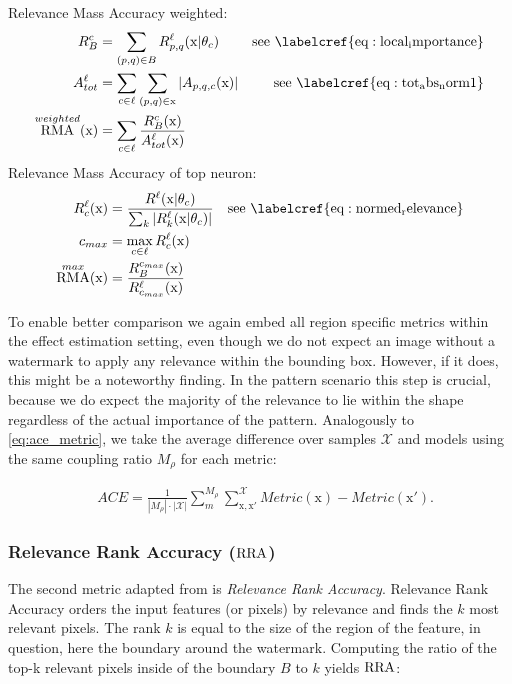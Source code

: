 Relevance Mass Accuracy weighted:
\begin{align}\displaystyle
R_B^c &= \sum_{(p,q) \in B} R_{p,q}^{\ell}(\mathrm{x} | \theta_c) & \mathrm{ see \ \labelcref{eq:local_importance}} \\
A_{tot}^{\ell} &=\sum_{c \in \ell} \sum_{(p,q) \in \mathrm{x}} |A_{p,q,c}(\mathrm{x})| & \mathrm{ see \ \labelcref{eq:tot_abs_norm1}} \\
\RMA^{weighted}(\mathrm{x}) &= \sum_{c \in \ell}  \frac{R_{B}^{c}(\mathrm{x})}{A_{tot}^{\ell}(\mathrm{x})} 
\end{align}
Relevance Mass Accuracy of top neuron:
\begin{align}\displaystyle
R_c^{\ell}(\mathrm{x}) & = \frac{R^{\ell}(\mathrm{x} |\theta_{c}) }{\sum_k |R_k^{\ell}(\mathrm{x} |\theta_{c})|} & \mathrm{ see \ \labelcref{eq:normed_relevance}} \\
c_{max} &= \max_{c \in \ell} R_c^{\ell}(\mathrm{x}) \\
\RMA^{max}(\mathrm{x}) &= \frac{
R_{B}^{c_{max}}(\mathrm{x})}{R_{c_{max}}^{\ell}(\mathrm{x})} 
\end{align}

To enable better comparison we again embed all region specific metrics within the effect estimation setting, even though we do not expect an image without a watermark to apply any relevance within the bounding box. However, if it does, this might be a noteworthy finding. In the pattern scenario this step is crucial, because we do expect the majority of the relevance to lie within the shape regardless of the actual importance of the pattern.
Analogously to \cref{eq:ace_metric}, we take the average difference over samples $\mathcal{X}$ and models using the same coupling ratio $M_{\rho}$ for each metric:

\begin{align}\label{eq:ace_rma}
& ACE = \frac{1}{|M_\rho|\cdot |\mathcal{X}| }\sum_{m}^{M_{\rho}} \sum_{\mathrm{x,x'}}^{\mathcal{X}} Metric(\mathrm{x}) - Metric(\mathrm{x'}).
\end{align}

\subsubsection{Relevance Rank Accuracy ($\operatorname*{RRA}$)}
The second metric adapted from \citet{Arras2022} is \textit{Relevance Rank Accuracy}.  
Relevance Rank Accuracy orders the input features (or pixels) by relevance and finds the $k$ most relevant pixels. The rank $k$ is equal to the size of the region of the feature, in question, here the boundary around the watermark. Computing the ratio of the top-k relevant pixels inside of the boundary $B$ to $k$ yields $\operatorname*{RRA}$:

